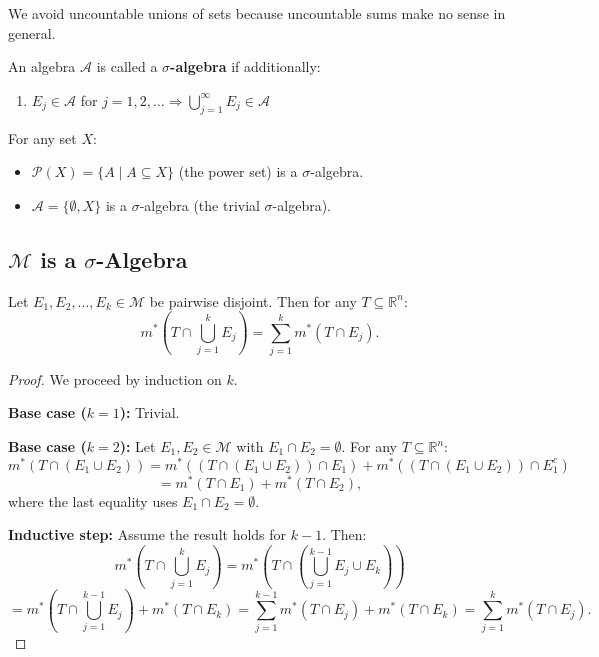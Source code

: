 \documentclass[11pt]{report}
\begin{document}
\begin{rembox}
We avoid uncountable unions of sets because uncountable sums make no sense in general.
\end{rembox}

\begin{defbox}
An algebra $\mathcal{A}$ is called a \textbf{$\sigma$-algebra} if additionally:
\begin{enumerate}
    \item[(3)] $E_j \in \mathcal{A}$ for $j = 1, 2, \ldots \Rightarrow \bigcup_{j=1}^{\infty} E_j \in \mathcal{A}$
\end{enumerate}
\end{defbox}

\begin{exbox}
For any set $X$:
\begin{itemize}
    \item $\mathcal{P}(X) = \{A \mid A \subseteq X\}$ (the power set) is a $\sigma$-algebra.
    \item $\mathcal{A} = \{\emptyset, X\}$ is a $\sigma$-algebra (the trivial $\sigma$-algebra).
\end{itemize}
\end{exbox}

\subsection{$\mathcal{M}$ is a $\sigma$-Algebra}

\begin{lembox}
Let $E_1, E_2, \ldots, E_k \in \mathcal{M}$ be pairwise disjoint. Then for any $T \subseteq \mathbb{R}^n$:
\[
m^*\left( T \cap \bigcup_{j=1}^{k} E_j \right) = \sum_{j=1}^{k} m^*(T \cap E_j).
\]
\end{lembox}

\begin{proof}
We proceed by induction on $k$.

\textbf{Base case ($k = 1$):} Trivial.

\textbf{Base case ($k = 2$):} Let $E_1, E_2 \in \mathcal{M}$ with $E_1 \cap E_2 = \emptyset$. For any $T \subseteq \mathbb{R}^n$:
\[
m^*(T \cap (E_1 \cup E_2)) = m^*((T \cap (E_1 \cup E_2)) \cap E_1) + m^*((T \cap (E_1 \cup E_2)) \cap E_1^c)
\]
\[
= m^*(T \cap E_1) + m^*(T \cap E_2),
\]
where the last equality uses $E_1 \cap E_2 = \emptyset$.

\textbf{Inductive step:} Assume the result holds for $k - 1$. Then:
\[
m^*\left( T \cap \bigcup_{j=1}^{k} E_j \right) = m^*\left( T \cap \left( \bigcup_{j=1}^{k-1} E_j \cup E_k \right) \right)
\]
\[
= m^*\left( T \cap \bigcup_{j=1}^{k-1} E_j \right) + m^*(T \cap E_k) = \sum_{j=1}^{k-1} m^*(T \cap E_j) + m^*(T \cap E_k) = \sum_{j=1}^{k} m^*(T \cap E_j).
\]
\end{proof}
\end{document}
